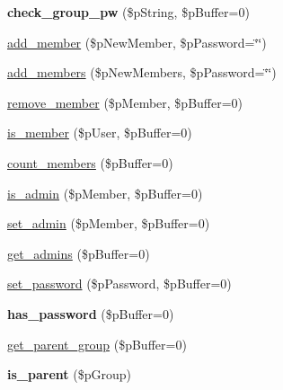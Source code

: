 \begin{DoxyCompactItemize}
\item 
\hypertarget{classsteam__group_ae846710b12d90e079140c5254b8acf8f}{
{\bfseries check\_\-group\_\-pw} (\$pString, \$pBuffer=0)}
\label{classsteam__group_ae846710b12d90e079140c5254b8acf8f}

\item 
\hyperlink{classsteam__group_af82cb6d7f3f7e6049f5589e28e6e077b}{add\_\-member} (\$pNewMember, \$pPassword=\char`\"{}\char`\"{})
\item 
\hyperlink{classsteam__group_af36df23097f5f7cdc1e1f291d90d8cd1}{add\_\-members} (\$pNewMembers, \$pPassword=\char`\"{}\char`\"{})
\item 
\hyperlink{classsteam__group_ae7e1fc5acea0edd0a64ea3c44a064ff1}{remove\_\-member} (\$pMember, \$pBuffer=0)
\item 
\hyperlink{classsteam__group_aabd04ab098490940c4ef0dd15bdf1d7f}{is\_\-member} (\$pUser, \$pBuffer=0)
\item 
\hyperlink{classsteam__group_a947b133e05c93d5018e931a36567700d}{count\_\-members} (\$pBuffer=0)
\item 
\hyperlink{classsteam__group_afefc3edbb08ffa0de08bbb36d7f2d2c6}{is\_\-admin} (\$pMember, \$pBuffer=0)
\item 
\hyperlink{classsteam__group_a22291717c35243986a932b453fa4cae6}{set\_\-admin} (\$pMember, \$pBuffer=0)
\item 
\hyperlink{classsteam__group_aa0c2d1c8f5eb48819d6ed5c6354ab935}{get\_\-admins} (\$pBuffer=0)
\item 
\hyperlink{classsteam__group_a0e1d3ba6743cd86a84f0ffa5246d8424}{set\_\-password} (\$pPassword, \$pBuffer=0)
\item 
\hypertarget{classsteam__group_a36dfaa4e3edb4aec060dae6e65d8f365}{
{\bfseries has\_\-password} (\$pBuffer=0)}
\label{classsteam__group_a36dfaa4e3edb4aec060dae6e65d8f365}

\item 
\hyperlink{classsteam__group_ad2d6c627e5beadf3c868a91b37af1f2f}{get\_\-parent\_\-group} (\$pBuffer=0)
\item 
\hypertarget{classsteam__group_a98e951c85f371ca91397392893f26c5e}{
{\bfseries is\_\-parent} (\$pGroup)}
\label{classsteam__group_a98e951c85f371ca91397392893f26c5e}


\end{DoxyCompactItemize}
